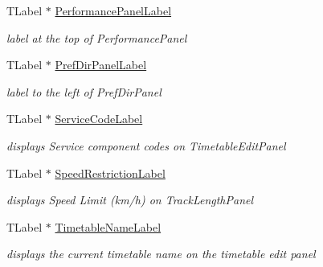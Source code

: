\begin{DoxyCompactItemize}
\mbox{\label{class_t_interface_a4b97febf985f3a4a5589f98fed9177ee}} 
T\+Label $\ast$ \mbox{\hyperlink{class_t_interface_a4b97febf985f3a4a5589f98fed9177ee}{Performance\+Panel\+Label}}
\begin{DoxyCompactList}\small\item\em label at the top of Performance\+Panel \end{DoxyCompactList}\item 
\mbox{\label{class_t_interface_acda3257c436e44b30e93d92fee4f1ae9}} 
T\+Label $\ast$ \mbox{\hyperlink{class_t_interface_acda3257c436e44b30e93d92fee4f1ae9}{Pref\+Dir\+Panel\+Label}}
\begin{DoxyCompactList}\small\item\em label to the left of Pref\+Dir\+Panel \end{DoxyCompactList}\item 
\mbox{\label{class_t_interface_a8635c7c8d66d2f6f4fd9932488afc044}} 
T\+Label $\ast$ \mbox{\hyperlink{class_t_interface_a8635c7c8d66d2f6f4fd9932488afc044}{Service\+Code\+Label}}
\begin{DoxyCompactList}\small\item\em displays \textquotesingle{}Service component codes\textquotesingle{} on Timetable\+Edit\+Panel \end{DoxyCompactList}\item 
\mbox{\label{class_t_interface_a0b36c69d7ea2798f62f0f65b8e5fc632}} 
T\+Label $\ast$ \mbox{\hyperlink{class_t_interface_a0b36c69d7ea2798f62f0f65b8e5fc632}{Speed\+Restriction\+Label}}
\begin{DoxyCompactList}\small\item\em displays \textquotesingle{}Speed Limit (km/h)\textquotesingle{} on Track\+Length\+Panel \end{DoxyCompactList}\item 
\mbox{\label{class_t_interface_a3abffdbcddebbccd64195ad563cf5933}} 
T\+Label $\ast$ \mbox{\hyperlink{class_t_interface_a3abffdbcddebbccd64195ad563cf5933}{Timetable\+Name\+Label}}
\begin{DoxyCompactList}\small\item\em displays the current timetable name on the timetable edit panel \end{DoxyCompactList}\item 

\end{DoxyCompactItemize}
